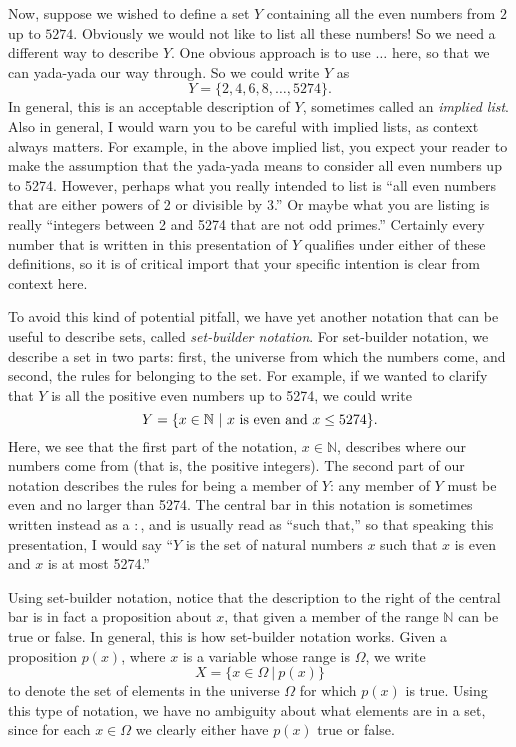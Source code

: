\documentclass{article}
\theoremstyle{definition}
\newcommand{\N}{\mathbb{N}}
\begin{document}
Now, suppose we wished to define a set $Y$ containing all the even numbers from $2$ up to $5274$. Obviously we would not like to list all these numbers! So we need a different way to describe $Y$. One obvious approach is to use $\dots$ here, so that we can yada-yada our way through. So we could write $Y$ as
\[ Y = \{2, 4, 6, 8, \dots, 5274\}.\]
In general, this is an acceptable description of $Y$, sometimes called an {\it implied list}. Also in general, I would warn you to be careful with implied lists, as context always matters. For example, in the above implied list, you expect your reader to make the assumption that the yada-yada means to consider all even numbers up to 5274. However, perhaps what you really intended to list is ``all even numbers that are either powers of 2 or divisible by 3.'' Or maybe what you are listing is really ``integers between 2 and 5274 that are not odd primes.'' Certainly every number that is written in this presentation of $Y$ qualifies under either of these definitions, so it is of critical import that your specific intention is clear from context here.

To avoid this kind of potential pitfall, we have yet another notation that can be useful to describe sets, called {\it set-builder notation}. For set-builder notation, we describe a set in two parts: first, the universe from which the numbers come, and second, the rules for belonging to the set. For example, if we wanted to clarify that $Y$ is all the positive even numbers up to 5274, we could write
\[ Y = \{x\in\N\ | \ x\hbox{ is even and }x\leq 5274\}.\]
Here, we see that the first part of the notation, $x\in\N$, describes where our numbers come from (that is, the positive integers). The second part of our notation describes the rules for being a member of $Y$: any member of $Y$ must be even and no larger than 5274. The central bar in this notation is sometimes written instead as a $:$, and is usually read as ``such that,'' so that speaking this presentation, I would say ``$Y$ is the set of natural numbers $x$ such that $x$ is even and $x$ is at most 5274.''

Using set-builder notation, notice that the description to the right of the central bar is in fact a proposition about $x$, that given a member of the range $\N$ can be true or false. In general, this is how set-builder notation works. Given a proposition $p(x)$, where $x$ is a variable whose range is $\Omega$, we write
\[X=\{x\in\Omega\ | \ p(x)\}\]
to denote the set of elements in the universe $\Omega$ for which $p(x)$ is true. Using this type of notation, we have no ambiguity about what elements are in a set, since for each $x\in\Omega$ we clearly either have $p(x)$ true or false.
\end{document}

